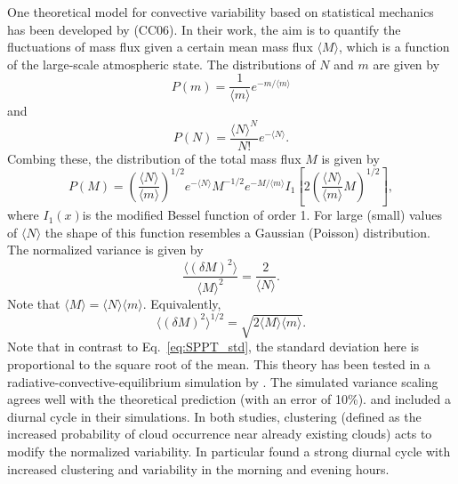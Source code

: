 \documentclass[a4paper, 12pt]{article}
\begin{document}
One theoretical model for convective variability based on statistical mechanics has been developed by \cite{Craig2006}(CC06). In their work, the aim is to quantify the fluctuations of mass flux given a certain mean mass flux $\langle M \rangle$, which is a function of the large-scale atmospheric state. The distributions of $N$ and $m$ are given by 
\begin{equation} \label{eq:m_dist}
 P(m) = \frac{1}{\langle m \rangle}e^{-m/\langle m \rangle}
\end{equation}
and 
\begin{equation} \label{eq:N_dist}
 P(N) = \frac{\langle N \rangle^N}{N!}e^{-\langle N \rangle}.
\end{equation}
Combing these, the distribution of the total mass flux $M$ is given by
\begin{equation} \label{eq:M_dist}
 P(M) = \left( \frac{\langle N \rangle}{\langle m \rangle} \right)^{1/2} e^{-\langle N \rangle} M^{-1/2} e^{-M/\langle m \rangle} I_1\left[ 2 \left( \frac{\langle N \rangle}{\langle m \rangle} M \right)^{1/2} \right],
\end{equation}
where $I_1(x)$is the modified Bessel function of order 1. For large (small) values of $\langle N \rangle$ the shape of this function resembles a Gaussian (Poisson) distribution. The normalized variance is given by 
\begin{equation} \label{eq:M_var}
 \frac{\langle (\delta M)^2 \rangle}{\langle M \rangle^2} = \frac{2}{\langle N \rangle}.
\end{equation}
Note that $\langle M \rangle = \langle N \rangle \langle m \rangle$. Equivalently,
\begin{equation} \label{eq:M_std}
 \langle (\delta M)^2 \rangle^{1/2}= \sqrt{2 \langle M \rangle \langle m \rangle}.
\end{equation}
Note that in contrast to Eq.~\ref{eq:SPPT_std}, the standard deviation here is proportional to the square root of the mean. This theory has been tested in a radiative-convective-equilibrium simulation by \cite{Cohen2006}. The simulated variance scaling agrees well with the theoretical prediction (with an error of 10\%). \cite{Davies2008} and \cite{Davoudi2010} included a diurnal cycle in their simulations. In both studies, clustering (defined as the increased probability of cloud occurrence near already existing clouds) acts to modify the normalized variability. In particular \cite{Davies2008} found a strong diurnal cycle with increased clustering and variability in the morning and evening hours. 
\end{document}
